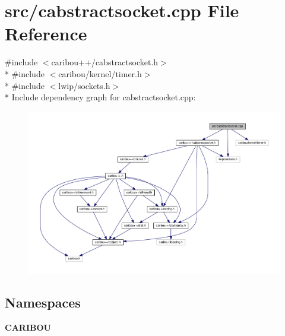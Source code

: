 \section{src/cabstractsocket.cpp File Reference}
\label{cabstractsocket_8cpp}
{\ttfamily \#include $<$caribou++/cabstractsocket.\-h$>$}\\*
{\ttfamily \#include $<$caribou/kernel/timer.\-h$>$}\\*
{\ttfamily \#include $<$lwip/sockets.\-h$>$}\\*
Include dependency graph for cabstractsocket.\-cpp\-:\nopagebreak
\begin{figure}[H]
\begin{center}
\leavevmode
\includegraphics[width=350pt]{cabstractsocket_8cpp__incl}
\end{center}
\end{figure}
\subsection*{Namespaces}
\begin{DoxyCompactItemize}
\item 
{\bf C\-A\-R\-I\-B\-O\-U}
\end{DoxyCompactItemize}
